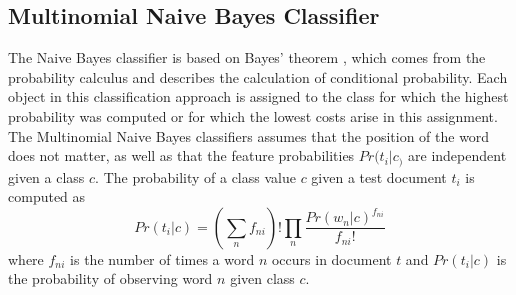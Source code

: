 \documentclass[a4paper, 11pt,titlepage,oneside,openany]{book}
\begin{document}
\subsection{Multinomial Naive Bayes Classifier}
The Naive Bayes classifier is based on  Bayes' theorem \cite{btheory}, which comes from the probability calculus and describes the calculation of conditional probability. Each object in this classification approach is assigned to the class for which the highest probability was computed or for which the lowest costs arise in this assignment.  \\
\noindent The Multinomial Naive Bayes classifiers assumes that the position of the word does not matter, as well as  that the feature probabilities $Pr(t_i|c_)$ are independent given a class $c$.
The probability of a class value $c$ given a test document $t_i$ is computed as \cite{multinomialnb}
\[
Pr(t_i|c)=(\sum_{n}f_{ni})!\prod_{n}\frac{Pr(w_n|c)^{f_{ni}}}{f_{ni}!}
\]
where $f_{ni}$ is the number of times a word $n$ occurs in document $t$ and $Pr(t_i|c)$ is the probability of observing word $n$ given class $c$.
\newpage
\end{document}
